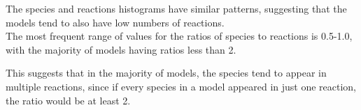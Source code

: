 \documentclass[portrait,a1paper,fontscale=0.49]{baposter}
\begin{document}
\begin{poster}
{\begin{multicols}{2}
  The species and reactions histograms have similar patterns, suggesting that the models tend to also have low numbers of reactions. \\
   
 The most frequent range of values for the ratios of species to reactions is 0.5-1.0, with the majority of models having ratios less than 2.
 
 This suggests that in the majority of models, the species tend to appear in multiple reactions, since if every species in a model appeared in just one reaction, the ratio would be at least 2.
 
 \end{multicols}
 }
 
\end{poster}
\end{document}

